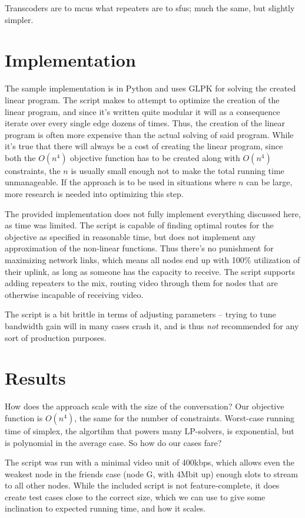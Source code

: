 Transcoders are to \glspl{mcu} what repeaters are to \glspl{sfu}; much the same, but slightly simpler.


\section{Implementation}\label{sec:implementation}

The sample implementation is in Python and uses GLPK for solving the created linear program. The script makes to attempt to optimize the creation of the linear program, and since it's written quite modular it will as a consequence iterate over every single edge dozens of times. Thus, the creation of the linear program is often more expensive than the actual solving of said program. While it's true that there will always be a cost of creating the linear program, since both the $O(n^4)$ objective function has to be created along with $O(n^4)$ constraints, the $n$ is usually small enough not to make the total running time unmanageable. If the approach is to be used in situations where $n$ can be large, more research is needed into optimizing this step.

The provided implementation does not fully implement everything discussed here, as time was limited. The script is capable of finding optimal routes for the objective as specified in reasonable time, but does not implement any approximation of the non-linear functions. Thus there's no punishment for maximizing network links, which means all nodes end up with 100\% utilization of their uplink, as long as someone has the capacity to receive. The script supports adding repeaters to the mix, routing video through them for nodes that are otherwise incapable of receiving video.

The script is a bit brittle in terms of adjusting parameters -- trying to tune bandwidth gain will in many cases crash it, and is thus \emph{not} recommended for any sort of production purposes.


\section{Results}\label{sec:results}

How does the approach scale with the size of the conversation? Our objective function is $O(n^4)$, the same for the number of constraints. Worst-case running time of simplex, the algortihm that powers many LP-solvers, is exponential, but is polynomial in the average case. So how do our cases fare?


The script was run with a minimal video unit of 400kbps, which allows even the weakest node in the friends case (node G, with 4Mbit up) enough slots to stream to all other nodes. While the included script is not feature-complete, it does create test cases close to the correct size, which we can use to give some inclination to expected running time, and how it scales.
